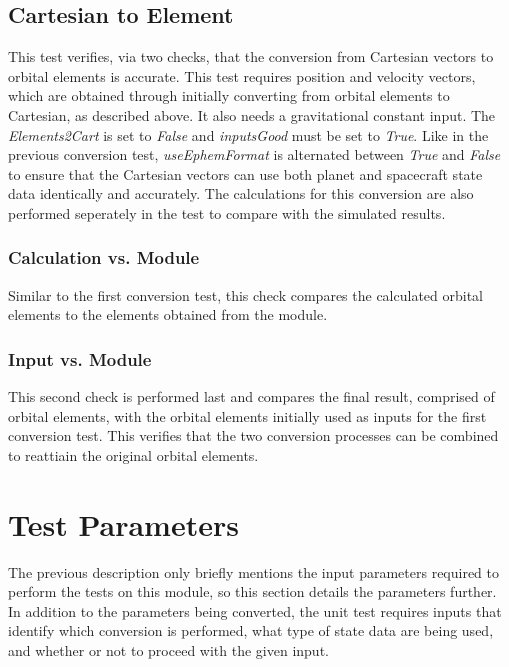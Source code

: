 \subsection{Cartesian to Element} 
This test verifies, via two checks, that the conversion from Cartesian vectors to orbital elements is accurate. This test requires position and velocity vectors, which are obtained through initially converting from orbital elements to Cartesian, as described above. It also needs a gravitational constant input. The \textit{Elements2Cart} is set to \textit{False} and \textit{inputsGood} must be set to \textit{True}. Like in the previous conversion test, \textit{useEphemFormat} is alternated between \textit{True} and \textit{False} to ensure that the Cartesian vectors can use both planet and spacecraft state data identically and accurately. The calculations for this conversion are also performed seperately in the test to compare with the simulated results.
\subsubsection{Calculation vs. Module}
Similar to the first conversion test, this check compares the calculated orbital elements to the elements obtained from the module.
\subsubsection{Input vs. Module}
This second check is performed last and compares the final result, comprised of orbital elements, with the orbital elements initially used as inputs for the first conversion test. This verifies that the two conversion processes can be combined to reattiain the original orbital elements.

\section{Test Parameters}

The previous description only briefly mentions the input parameters required to perform the tests on this module, so this section details the parameters further. In addition to the parameters being converted, the unit test requires inputs that identify which conversion is performed, what type of state data are being used, and whether or not to proceed with the given input. 

